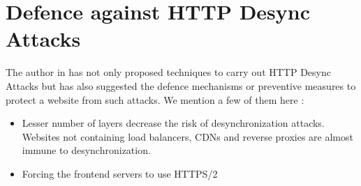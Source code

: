 \chapter{Defence against HTTP Desync Attacks}
The author in \cite{b6} has not only proposed techniques to carry out HTTP Desync Attacks but has also suggested the defence mechanisms or preventive measures to protect a website from such attacks. We mention a few of them here :
\begin{itemize}
	\item Lesser number of layers decrease the risk of desynchronization attacks. Websites not containing load balancers, CDNs and reverse proxies are almost immune to desynchronization. 
	\item Forcing the frontend servers to use HTTPS/2 \cite{b15} 
\end{itemize}